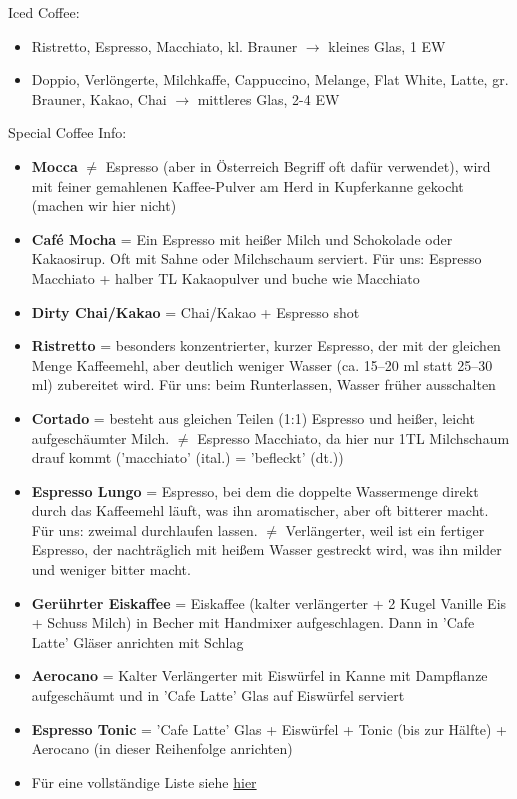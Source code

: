 \documentclass[a4paper,12pt]{article}
\newcounter{row}
\begin{document}
\vspace{2em}

Iced Coffee:
\begin{itemize}[itemsep=1pt, topsep=0pt]
    \item[] Ristretto, Espresso, Macchiato, kl. Brauner $\rightarrow$ kleines Glas, 1 EW
    \item[] Doppio, Verlöngerte, Milchkaffe, Cappuccino, Melange, Flat White, Latte, gr. Brauner, Kakao, Chai $\rightarrow$ mittleres Glas, 2-4 EW
\end{itemize}

\vspace{2em}

Special Coffee Info:
\begin{itemize}[itemsep=1pt, topsep=0pt]
    \item[] \textbf{Mocca} $\neq$ Espresso (aber in Österreich Begriff oft dafür verwendet), wird mit feiner gemahlenen Kaffee-Pulver am Herd in Kupferkanne gekocht (machen wir hier nicht)
    \item[] \textbf{Café Mocha} = Ein Espresso mit heißer Milch und Schokolade oder Kakaosirup. Oft mit Sahne oder Milchschaum serviert. Für uns: Espresso Macchiato + halber TL Kakaopulver und buche wie Macchiato
    \item[] \textbf{Dirty Chai/Kakao} = Chai/Kakao + Espresso shot
    \item[] \textbf{Ristretto} = besonders konzentrierter, kurzer Espresso, der mit der gleichen Menge Kaffeemehl, aber deutlich weniger Wasser (ca. 15–20 ml statt 25–30 ml) zubereitet wird. Für uns: beim Runterlassen, Wasser früher ausschalten
    \item[] \textbf{Cortado} = besteht aus gleichen Teilen (1:1) Espresso und heißer, leicht aufgeschäumter Milch. $\neq$ Espresso Macchiato, da hier nur 1TL Milchschaum drauf kommt ('macchiato' (ital.) = 'befleckt' (dt.))
    \item[] \textbf{Espresso Lungo} = Espresso, bei dem die doppelte Wassermenge direkt durch das Kaffeemehl läuft, was ihn aromatischer, aber oft bitterer macht. Für uns: zweimal durchlaufen lassen. $\neq$ Verlängerter, weil ist ein fertiger Espresso, der nachträglich mit heißem Wasser gestreckt wird, was ihn milder und weniger bitter macht.
    \item[] \textbf{Gerührter Eiskaffee} = Eiskaffee (kalter verlängerter + 2 Kugel Vanille Eis + Schuss Milch) in Becher mit Handmixer aufgeschlagen. Dann in 'Cafe Latte' Gläser anrichten mit Schlag
    \item[] \textbf{Aerocano} = Kalter Verlängerter mit Eiswürfel in Kanne mit Dampflanze aufgeschäumt und in 'Cafe Latte' Glas auf Eiswürfel serviert
    \item[] \textbf{Espresso Tonic} = 'Cafe Latte' Glas + Eiswürfel + Tonic (bis zur Hälfte) + Aerocano (in dieser Reihenfolge anrichten)
    \item[] Für eine vollständige Liste siehe \href{https://de.wikipedia.org/wiki/Liste_von_Kaffeespezialit%C3%A4ten}{hier}
\end{itemize}
\end{document}
